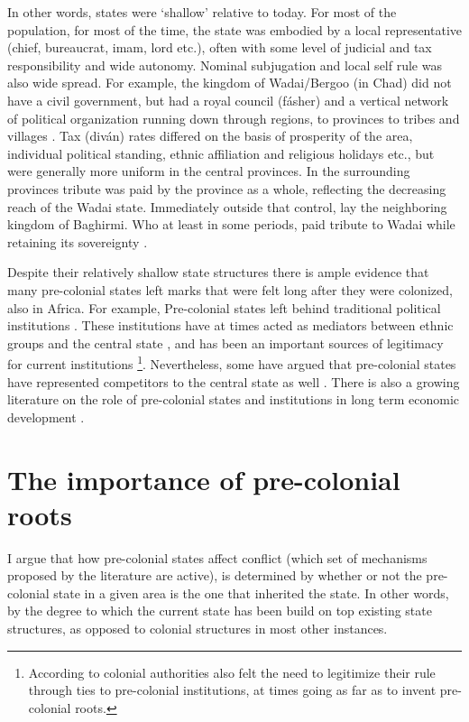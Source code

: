 \documentclass[12pt]{article}
\begin{document}
In other words, states were `shallow' relative to today. For most of the
population, for most of the time, the state was embodied by a local
representative (chief, bureaucrat, imam, lord etc.), often with some level of
judicial and tax responsibility and wide autonomy. Nominal subjugation and local
self rule was also wide spread. For example, the kingdom of Wadai/Bergoo (in
Chad) did not have a civil government, but had a royal council (fásher) and a
vertical network of political organization running down through regions, to
provinces to tribes and villages \citep{barth1857travels}. Tax (diván) rates
differed on the basis of prosperity of the area, individual political standing,
ethnic affiliation and religious holidays etc., but were generally more uniform
in the central provinces. In the surrounding provinces tribute was paid by the
province as a whole, reflecting the decreasing reach of the Wadai state.
Immediately outside that control, lay the neighboring kingdom of Baghirmi. Who
at least in some periods, paid tribute to Wadai while retaining its sovereignty
\citep{barth1857travels}.

Despite their relatively shallow state structures there is ample evidence that
many pre-colonial states left marks that were felt long after they were
colonized, also in Africa. For example, Pre-colonial states left behind
traditional political institutions \citep{Beall_2005, Holzinger_2020,
Neupert_Wentz_2021, Ubink_2008}. These institutions have at times acted as
mediators between ethnic groups and the central state \citep{boone2014property,
Englebert2002}, and has been an important sources of legitimacy for current
institutions \citep{Wig2016}\footnote{According to \citet{mamdani2018citizen}
	colonial authorities also felt the need to legitimize their rule through
	ties to pre-colonial institutions, at times going as far as to invent
pre-colonial roots.}. Nevertheless, some have argued that pre-colonial states
have represented competitors to the central state as well \citep{Herbst2014}.
There is also a growing literature on the role of pre-colonial states and
institutions in long term economic development \citep{Michalopoulos2018,
Acemoglu2014, Gennaioli2007, Bockstette2002}.

\section{The importance of pre-colonial roots}

I argue that how pre-colonial states affect conflict (which set of mechanisms
proposed by the literature are active), is determined by whether or not the
pre-colonial state in a given area is the one that inherited the state.
In other words, by the degree to which the current state has been build on top
existing state structures, as opposed to colonial structures in most other
instances. 
\end{document}
